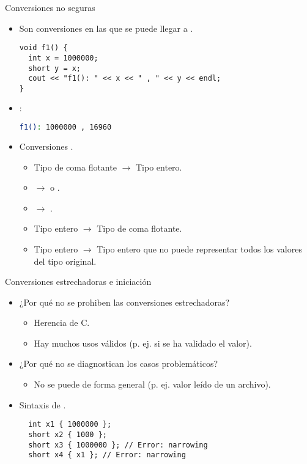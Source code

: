 \begin{frame}[t,fragile]{Conversiones no seguras}
\vspace{-0.5em}
\begin{itemize}
  \item Son conversiones en las que se puede llegar a 
        .
\begin{lstlisting}
void f1() {
  int x = 1000000;
  short y = x;
  cout << "f1(): " << x << " , " << y << endl;
}
\end{lstlisting}

  \item {}:
\begin{lstlisting}[language=bash,basicstyle=\footnotesize\ttfamily]
f1(): 1000000 , 16960
\end{lstlisting}

  \item Conversiones .
    \begin{itemize}
      \item Tipo de coma flotante $\rightarrow$ Tipo entero.
      \item {} $\rightarrow$  o .
      \item {} $\rightarrow$ .
      \item Tipo entero $\rightarrow$ Tipo de coma flotante.
      \item Tipo entero $\rightarrow$ Tipo entero que no puede representar todos los valores del tipo original.
    \end{itemize}
\end{itemize}
\end{frame}

\begin{frame}[t,fragile]{Conversiones estrechadoras e iniciación}
\begin{itemize}
  \item ¿Por qué no se prohiben las conversiones estrechadoras?
    \begin{itemize}
      \item Herencia de C.
      \item Hay muchos usos válidos (p. ej. si se ha validado el valor).
    \end{itemize}

  \item ¿Por qué no se diagnostican los casos problemáticos?
    \begin{itemize}
      \item No se puede de forma general (p. ej. valor leído de un archivo).
    \end{itemize}

  \item Sintaxis de .
\begin{lstlisting}
  int x1 { 1000000 };
  short x2 { 1000 };
  short x3 { 1000000 }; // Error: narrowing
  short x4 { x1 }; // Error: narrowing
\end{lstlisting}
\end{itemize}
\end{frame}

